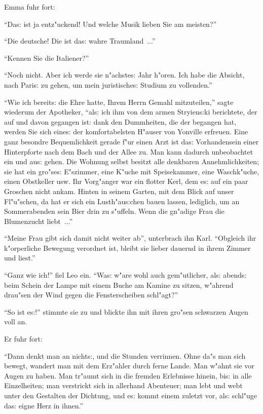 \documentclass[oneside,12pt]{book}
\newcommand{\s}{s:}%
\begin{document}
Emma fuhr fort:

"`Da{\s} ist ja ent\/z"uckend! Und welche Musik lieben Sie am
meisten?"'

"`Die deutsche! Die ist da{\s} wahre Traumland~..."'

"`Kennen Sie die Italiener?"'

"`Noch nicht. Aber ich werde sie n"achste{\s} Jahr h"oren. Ich
habe die Absicht, nach Pari{\s} zu gehen, um mein juristische{\s}
Studium zu vollenden."'

"`Wie ich bereit{\s} die Ehre hatte, Ihrem Herrn Gemahl
mit\/zuteilen,"' sagte wiederum der Apotheker, "`al{\s} ich ihm von
dem armen Stryien{\s}ki berichtete, der auf und davon gegangen
ist: dank den Dummheiten, die der begangen hat, werden Sie sich
eine{\s} der komfortabelsten H"auser von Yonville erfreuen. Eine
ganz besondre Bequemlichkeit gerade f"ur einen Arzt ist da{\s}
Vorhandensein einer Hinterpforte nach dem Bach und der Allee zu.
Man kann dadurch unbeobachtet ein und au{\s} gehen. Die Wohnung
selbst besitzt alle denkbaren Annehmlichkeiten; sie hat ein
gro"se{\s} E"szimmer, eine K"uche mit Speisekammer, eine
Waschk"uche, einen Obstkeller usw. Ihr Vorg"anger war ein flotter
Kerl, dem e{\s} auf ein paar Groschen nicht ankam. Hinten in
seinem Garten, mit dem Blick auf unser Fl"u"schen, da hat er sich
ein Lusth"au{\s}chen bauen lassen, lediglich, um an Sommerabenden
sein Bier drin zu s"uffeln. Wenn die gn"adige Frau die Blumenzucht
liebt~..."'

"`Meine Frau gibt sich damit nicht weiter ab"', unterbrach ihn
Karl. "`Obgleich ihr k"orperliche Bewegung verordnet ist, bleibt
sie lieber dauernd in ihrem Zimmer und liest."'

"`Ganz wie ich!"' fiel Leo ein. "`Wa{\s} w"are wohl auch
gem"utlicher, al{\s} abend{\s} beim Schein der Lampe mit einem
Buche am Kamine zu sitzen, w"ahrend drau"sen der Wind gegen die
Fensterscheiben schl"agt?"'

"`So ist e{\s}!"' stimmte sie zu und blickte ihn mit ihren gro"sen
schwarzen Augen voll an.

Er fuhr fort:

"`Dann denkt man an nicht{\s}, und die Stunden verrinnen. Ohne
da"s man sich bewegt, wandert man mit dem Erz"ahler durch ferne
Lande. Man w"ahnt sie vor Augen zu haben. Man tr"aumt sich in die
fremden Erlebnisse hinein, bi{\s} in alle Einzelheiten; man
verstrickt sich in allerhand Abenteuer; man lebt und webt unter
den Gestalten der Dichtung, und e{\s} kommt einem zuletzt vor,
al{\s} schl"uge da{\s} eigne Herz in ihnen."'
\end{document}
